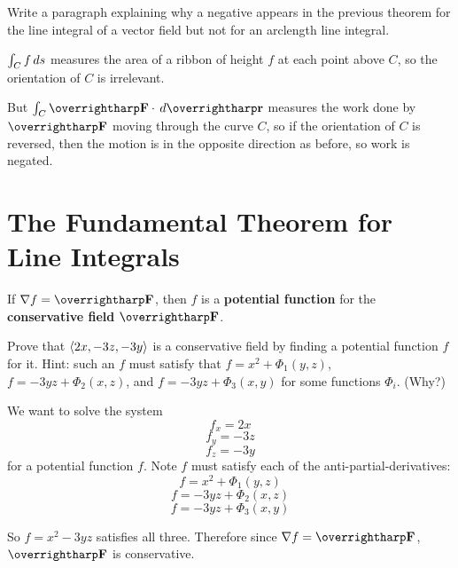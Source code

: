 \documentclass[letterpaper, twoside, 12pt]{book}
\begin{document}
          \begin{problem}
            Write a paragraph explaining why a negative appears in the
            previous theorem for the
            line integral of a vector field but not for an arclength
            line integral.
          \end{problem}

          \begin{solution}
            \(\int_C f\,d{s}\) measures the area of a ribbon
            of height \(f\) at each point above \(C\), so the orientation
            of \(C\) is irrelevant.

            But \(\int_C \vect F\cdot\dvar{\vect r}\) measures the work
            done by \(\vect F\) moving through the curve \(C\), so
            if the orientation of \(C\) is reversed, then the motion is
            in the opposite direction as before, so work is negated.
          \end{solution}


\section{The Fundamental Theorem for Line Integrals} %

\begin{definition}
  If $\nabla f=\vect{F}$, then $f$ is a \textbf{potential function}
  for the \textbf{conservative field} $\vect{F}$.
\end{definition}

          \begin{problem} %
            Prove that $\langle2x,-3z,-3y\rangle$ is a conservative field by
            finding a potential function $f$ for it. Hint: such an $f$
            must satisfy that $f=x^2+\Phi_1(y,z)$, $f=-3yz+\Phi_2(x,z)$,
            and $f=-3yz+\Phi_3(x,y)$ for some functions $\Phi_i$. (Why?)
          \end{problem}

          \begin{solution}
            We want to solve the system
              \[
                f_x = 2x
              \]
              \[
                f_y = -3z
              \]
              \[
                f_z = -3y
              \]
            for a potential function \(f\). Note \(f\) must satisfy
            each of the anti-partial-derivatives:
              \[
                f = x^2+\Phi_1(y,z)
              \]
              \[
                f = -3yz+\Phi_2(x,z)
              \]
              \[
                f = -3yz+\Phi_3(x,y)
              \]

            So \(f=x^2-3yz\) satisfies all three. Therefore since
            \(\nabla f=\vect{F}\), \(\vect F\) is conservative.
          \end{solution}
\end{document}
